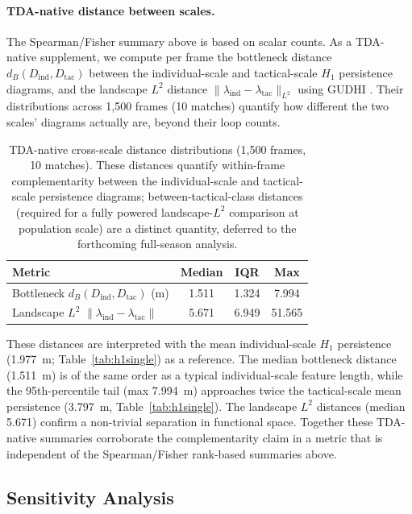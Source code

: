 \paragraph{TDA-native distance between scales.} The Spearman/Fisher summary above is based on scalar counts. As a TDA-native supplement, we compute per frame the bottleneck distance \(d_B(D_\mathrm{ind}, D_\mathrm{tac})\) between the individual-scale and tactical-scale \(H_1\) persistence diagrams, and the landscape \(L^2\) distance \(\|\lambda_\mathrm{ind}-\lambda_\mathrm{tac}\|_{L^2}\) \citep{Bubenik2015} using GUDHI \citep{Tauzin2021}. Their distributions across 1{,}500 frames (10 matches) quantify how different the two scales' diagrams actually are, beyond their loop counts.

\begin{table}[H]
  \centering
  \caption{TDA-native cross-scale distance distributions (1{,}500 frames, 10 matches). These distances quantify within-frame complementarity between the individual-scale and tactical-scale persistence diagrams; between-tactical-class distances (required for a fully powered landscape-$L^2$ comparison at population scale) are a distinct quantity, deferred to the forthcoming full-season analysis.}
  \label{tab:tda_distances}
  \begin{tabular}{@{}lccc@{}}
      \toprule
      Metric & Median & IQR & Max \\
      \midrule
      Bottleneck \(d_B(D_\mathrm{ind}, D_\mathrm{tac})\) (m) & 1.511 & 1.324 & 7.994 \\
      Landscape \(L^2\) \(\|\lambda_\mathrm{ind}-\lambda_\mathrm{tac}\|\) & 5.671 & 6.949 & 51.565 \\
      \bottomrule
  \end{tabular}
\end{table}

These distances are interpreted with the mean individual-scale \(H_1\) persistence (1.977~m; Table~\ref{tab:h1single}) as a reference. The median bottleneck distance (1.511~m) is of the same order as a typical individual-scale feature length, while the 95th-percentile tail (max 7.994~m) approaches twice the tactical-scale mean persistence (3.797~m, Table~\ref{tab:h1single}). The landscape \(L^2\) distances (median 5.671) confirm a non-trivial separation in functional space. Together these TDA-native summaries corroborate the complementarity claim in a metric that is independent of the Spearman/Fisher rank-based summaries above.

\subsection{Sensitivity Analysis}
\label{sec:sensitivity}

